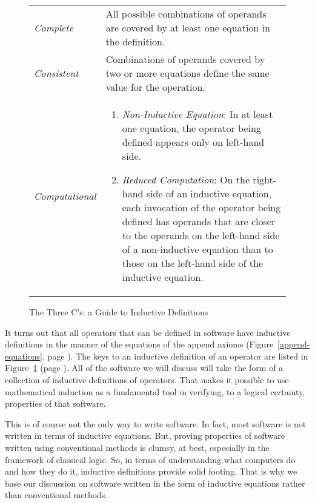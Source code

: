 \begin{figure}
\begin{center}
\begin{tabular}{lp{3.5in}}
\emph{Complete} & All possible combinations of operands are covered by at least one equation in the definition. \\
\emph{Consistent} & Combinations of operands covered by two or more equations define the same value for the operation. \\
\emph{Computational} &
\begin{enumerate}
\item \emph{Non-Inductive Equation}: In at least one equation,
the operator being defined appears only on left-hand side.
\item \emph{Reduced Computation}: On the right-hand side of an inductive equation,
each invocation of the operator being defined has operands that
are closer to the operands on the left-hand side of a non-inductive equation
than to those on the left-hand side of the inductive equation.
\end{enumerate}
\end{tabular}
\end{center}
\caption{The Three C's: a Guide to Inductive Definitions}
\label{fig:inductive-def-keys}
\end{figure}

It turns out that all operators that can be defined in
software
have inductive definitions in the manner of the equations
of the append axioms (Figure~\ref{append-equations}, page \pageref{append-equations}).
The keys to an inductive definition of an operator are  listed in
Figure~\ref{fig:inductive-def-keys} (page \pageref{fig:inductive-def-keys}).
All of the software we will discuss will take the form of a collection
of inductive definitions of operators.
That makes it possible to use mathematical induction as
a fundamental tool in verifying, to a logical certainty,
properties of that software.

This is of course not the only way to write software.
In fact, most software is not written in terms of inductive equations.
But, proving properties of software written using conventional methods
is clumsy, at best, especially in the framework of classical logic.
So, in terms of understanding what computers do and how they do it,
inductive definitions provide solid footing.
That is why we base our discussion on software written
in the form of inductive equations rather than conventional methods.

